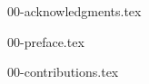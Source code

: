 \documentclass[
  draftbib,
  draftglossaries,
  f24paper,  %
  fontsize=10pt, %
  twoside=true, %
  secnumdepth=2, %
  listing=minted,
  numbers=noenddot,
]{kaobook}
\begin{document}
\maketitle


{00-acknowledgments.tex}


{00-preface.tex}


{00-contributions.tex}


\begingroup %


\etocclasstocstyle %
\etocstandardlines %

\tableofcontents %

\endgroup

\end{document}
